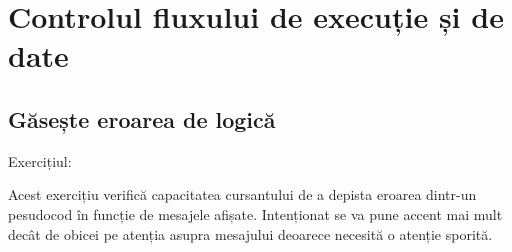 \chapter{Controlul fluxului de execuție și de date}

\section{Găsește eroarea de logică}

Exercițiul:



Acest exercițiu verifică capacitatea cursantului de a depista eroarea dintr-un
pesudocod în funcție de mesajele afișate. Intenționat se va pune accent mai
mult decât de obicei pe atenția asupra mesajului deoarece necesită o atenție
sporită.
